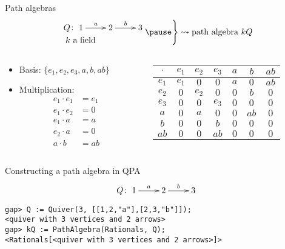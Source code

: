 \documentclass[usenames,dvipsnames]{beamer}
\begin{document}
\begin{frame}{Path algebras}{}
\[
\left.
\begin{aligned}
Q &\colon \xymatrix{1\ar[r]^a & 2\ar[r]^b & 3} \\
k &\ \text{a field}
\end{aligned}
\pause
\right\}
\rightsquigarrow
\text{path algebra $kQ$}
\]
\begin{columns}
\begin{column}{0.5\textwidth}
\begin{itemize}
\pause
\item Basis: $\{ e_1, e_2, e_3, a, b, ab \}$\\
\pause
\item Multiplication:
\begin{align*}
e_1 \cdot e_1 &= e_1 \\
e_1 \cdot e_2 &= 0 \\
e_1 \cdot a &= a \\
e_2 \cdot a &= 0 \\
a \cdot b &= ab &
\end{align*}
\pause
\end{itemize}
\end{column}
\begin{column}{0.5\textwidth}
\begin{tabular}{c|cccccc}
$\cdot$ & $e_1$ & $e_2$ & $e_3$ & $a$   & $b$   & $ab$ \\
\hline
$e_1$   & $e_1$ & $0$   & $0$   & $a$   & $0$   & $ab$ \\
$e_2$   & $0$   & $e_2$ & $0$   & $0$   & $b$   & $0$  \\
$e_3$   & $0$   & $0$   & $e_3$ & $0$   & $0$   & $0$  \\
$a$     & $0$   & $a$   & $0$   & $0$   & $ab$  & $0$  \\
$b$     & $0$   & $0$   & $b$   & $0$   & $0$   & $0$  \\
$ab$    & $0$   & $0$   & $ab$  & $0$   & $0$   & $0$
\end{tabular}
\end{column}
\end{columns}
\end{frame}

\begin{frame}[fragile]{Constructing a path algebra in QPA}{}
{\Large
\[
Q \colon \xymatrix{1\ar[r]^a & 2\ar[r]^b & 3}
\]
}
\begin{verbatim}
gap> Q := Quiver(3, [[1,2,"a"],[2,3,"b"]]); 
<quiver with 3 vertices and 2 arrows>
gap> kQ := PathAlgebra(Rationals, Q);
<Rationals[<quiver with 3 vertices and 2 arrows>]>
\end{verbatim}



\end{frame}
\end{document}
